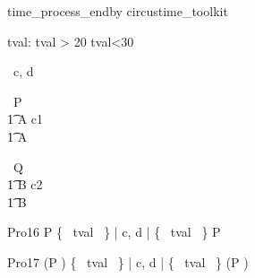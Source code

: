 \begin{zsection}
   \SECTION time\_process\_endby \parents circustime\_toolkit
\end{zsection}


\begin{axdef}
   tval: \nat
\where
   tval > 20 \land tval<30
\end{axdef}



\begin{circus}
   \circchannel\ c, d \\
\end{circus}



\begin{circus}
    \circprocess\ P \circdef  \circbegin  \\
    \t1 A \circdef c1 \then \Skip \\
    \t1 \circspot A \\
    \circend
\end{circus}



\begin{circus}
    \circprocess\ Q \circdef  \circbegin  \\
    \t1 B \circdef c2 \then \Skip \\
    \t1 \circspot B \\
    \circend
\end{circus}



\begin{circus}
    \circprocess Pro16 \circdef P \circendby {} \rcirctime  \lpar \{~ tval ~\} | \lchanset c, d \rchanset | \{~ tval ~\} \rpar P \circendby {} \rcirctime  \\
\end{circus}

\begin{circus}
    \circprocess Pro17 \circdef (P \circendby {} \rcirctime ) \lpar \{~ tval ~\} | \lchanset c, d \rchanset | \{~ tval ~\} \rpar (P \circendby {} \rcirctime ) \\
\end{circus}



